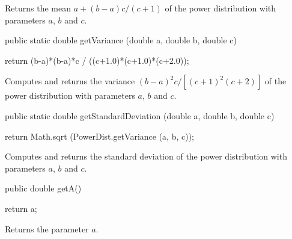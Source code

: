 \begin{tabb} Returns the mean $a + (b-a)c/(c+1)$ of the power distribution
with parameters  $a$, $b$ and $c$.
\end{tabb}
\begin{htmlonly}
\end{htmlonly}
\begin{code}

   public static double getVariance (double a, double b, double c)\begin{hide} {
      return (b-a)*(b-a)*c / ((c+1.0)*(c+1.0)*(c+2.0));
   }\end{hide}
\end{code}
\begin{tabb}  Computes and returns the variance $(b-a)^2 c / [(c+1)^2(c+2)]$
   of the power distribution with parameters $a$, $b$ and $c$.
\end{tabb}
\begin{htmlonly}
\end{htmlonly}
\begin{code}

   public static double getStandardDeviation (double a, double b, double c)\begin{hide} {
      return Math.sqrt (PowerDist.getVariance (a, b, c));
   }\end{hide}
\end{code}
\begin{tabb}  Computes and returns the standard deviation
   of the power distribution with parameters $a$, $b$ and $c$.
\end{tabb}
\begin{htmlonly}
\end{htmlonly}
\begin{code}

   public double getA()\begin{hide} {
      return a;
   }\end{hide}
\end{code}
  \begin{tabb} Returns the parameter $a$.
  \end{tabb}
\begin{htmlonly}
\end{htmlonly}
